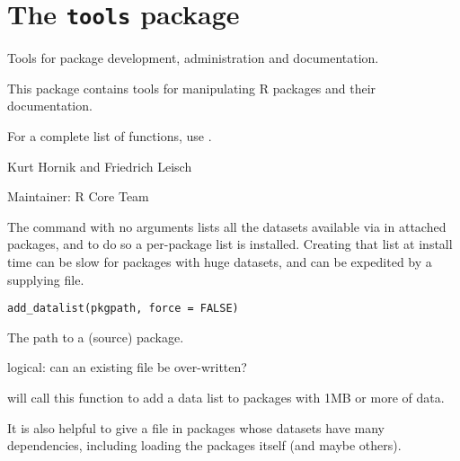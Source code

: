 
\chapter{The \texttt{tools} package}
%
\begin{Description}\relax
Tools for package development, administration and documentation.
\end{Description}
%
\begin{Details}\relax
This package contains tools for manipulating R packages and their
documentation.

For a complete list of functions, use .

\end{Details}
%
\begin{Author}\relax
Kurt Hornik and Friedrich Leisch

Maintainer: R Core Team 
\end{Author}
%
\begin{Description}\relax
The  command with no arguments lists all the
datasets available via  in attached packages, and to do so a
per-package list is installed.  Creating that list at install time can
be slow for packages with huge datasets, and can be expedited by a
supplying  file.
\end{Description}
%
\begin{Usage}
\begin{verbatim}
add_datalist(pkgpath, force = FALSE)
\end{verbatim}
\end{Usage}
%
\begin{Arguments}
\begin{ldescription}
\item[\code{pkgpath}] The path to a (source) package.

\item[\code{force}] logical: can an existing  file be
over-written?
\end{ldescription}
\end{Arguments}
%
\begin{Details}\relax
{} will call this function to add a data list to
packages with 1MB or more of data.

It is also helpful to give a  file in packages
whose datasets have many dependencies, including loading the packages
itself (and maybe others).
\end{Details}
